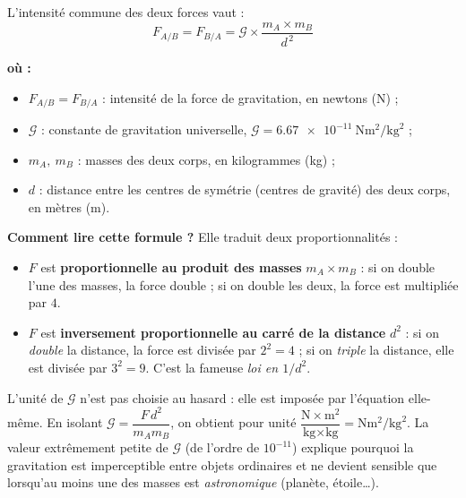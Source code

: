 \documentclass[11pt,a4paper]{article}
\newenvironment{ou}{%
  \par\smallskip\noindent\textbf{où :}\nopagebreak
  \begin{itemize}[leftmargin=1.8em,topsep=2pt,itemsep=1.5pt,parsep=0pt]}%
  {\end{itemize}}
\newcommand{\Grav}{\mathcal{G}}        %
\begin{document}
\begin{formule}
L'intensité commune des deux forces vaut :
\[
\boxed{\;F_{A/B}=F_{B/A}=\Grav\times\dfrac{m_A\times m_B}{d^{\,2}}\;}
\]
\begin{ou}
  \item $F_{A/B}=F_{B/A}$ : intensité de la force de gravitation, en newtons (\si{\newton}) ;
  \item $\Grav$ : constante de gravitation universelle,
        $\Grav=\SI{6.67e-11}{\newton\metre\squared\per\kilogram\squared}$ ;
  \item $m_A,\ m_B$ : masses des deux corps, en kilogrammes (\si{\kilogram}) ;
  \item $d$ : distance entre les centres de symétrie (centres de gravité) des deux
        corps, en mètres (\si{\metre}).
\end{ou}
\end{formule}

\noindent\textbf{Comment lire cette formule ?} Elle traduit deux proportionnalités :
\begin{itemize}[leftmargin=1.6em,topsep=2pt,itemsep=1pt]
  \item $F$ est \textbf{proportionnelle au produit des masses} $m_A\times m_B$ : si on
        double l'une des masses, la force double ; si on double les deux, la force est
        multipliée par $4$.
  \item $F$ est \textbf{inversement proportionnelle au carré de la distance} $d^2$ :
        si on \emph{double} la distance, la force est divisée par $2^2=4$ ; si on
        \emph{triple} la distance, elle est divisée par $3^2=9$. C'est la fameuse
        \emph{loi en $1/d^2$}.
\end{itemize}

\begin{remarque}[unité de la constante $\Grav$]
L'unité de $\Grav$ n'est pas choisie au hasard : elle est imposée par l'équation
elle-même. En isolant $\Grav=\dfrac{F\,d^2}{m_A m_B}$, on obtient pour unité
$\dfrac{\si{\newton}\times\si{\metre\squared}}{\si{\kilogram}\times\si{\kilogram}}
 =\si{\newton\metre\squared\per\kilogram\squared}$. La valeur extrêmement petite de
$\Grav$ (de l'ordre de $10^{-11}$) explique pourquoi la gravitation est imperceptible
entre objets ordinaires et ne devient sensible que lorsqu'au moins une des masses est
\emph{astronomique} (planète, étoile\dots).
\end{remarque}
\end{document}
